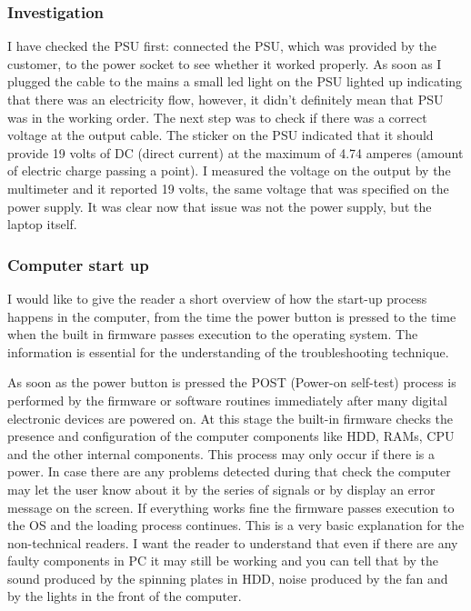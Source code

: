 \documentclass[10pt,a4paper,headinclude=true,twoside]{report}
\begin{document}
\subsubsection{Investigation}
I have checked the PSU first: connected the PSU, which was provided by the customer, to the power socket to see whether it worked properly. As soon as I plugged the cable to the mains a small led light on the PSU lighted up indicating that there was an electricity flow, however, it didn't definitely mean that PSU was in the working order. The next step was to check if there was a correct voltage at the output cable. The sticker on the PSU indicated that it should provide 19 volts of DC (direct current) at the maximum of 4.74 amperes (amount of electric charge passing a point). I measured the voltage on the output by the multimeter and it reported 19 volts, the same voltage that was specified on the power supply. It was clear now that issue was not the power supply, but the laptop itself.  
\subsubsection{Computer start up}
I would like to give the reader a short overview of how the start-up process happens in the computer, from the time the power button is pressed to the time when the built in firmware passes execution to the operating system. The information is essential for the understanding of the troubleshooting technique.  

As soon as the power button is pressed the POST (Power-on self-test) process is performed by the firmware or software routines immediately after many digital electronic devices are powered on\cite{POST}. At this stage the built-in firmware checks the presence and configuration of the computer components like HDD, RAMs, CPU and the other internal components. This process may only occur if there is a power. In case there are any problems detected during that check the computer may let the user know about it by the series of signals or by display an error message on the screen. If everything works fine the firmware passes execution to the OS and the loading process continues. This is a very basic explanation for the non-technical readers. I want the reader to understand that even if there are any faulty components in PC it may still be working and you can tell that by the sound produced by the spinning plates in HDD, noise produced by the fan and by the lights in the front of the computer.
\end{document}
